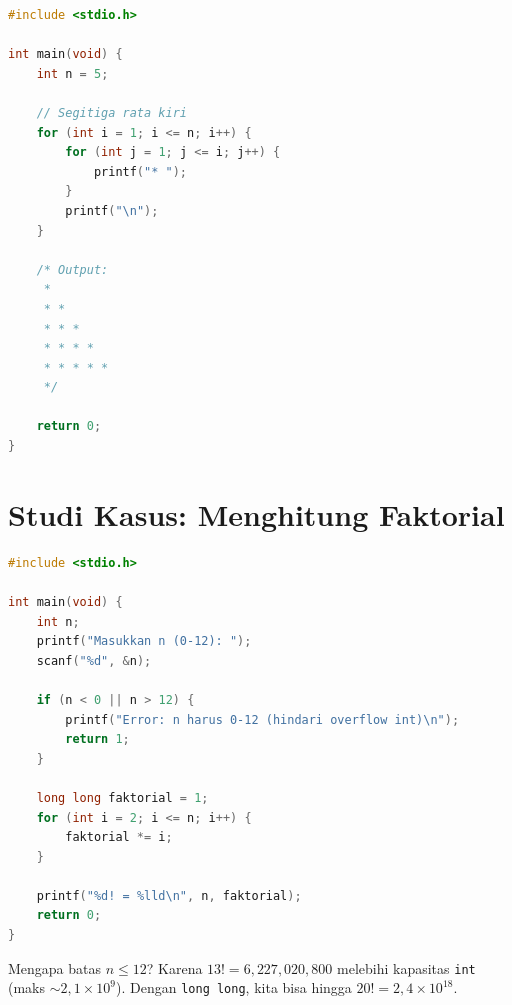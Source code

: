 \documentclass[../main.tex]{subfiles}
\begin{document}
\begin{lstlisting}[language=C,caption=Pola segitiga bintang]
#include <stdio.h>

int main(void) {
    int n = 5;
    
    // Segitiga rata kiri
    for (int i = 1; i <= n; i++) {
        for (int j = 1; j <= i; j++) {
            printf("* ");
        }
        printf("\n");
    }
    
    /* Output:
     * 
     * * 
     * * * 
     * * * * 
     * * * * * 
     */
    
    return 0;
}
\end{lstlisting}





\section{Studi Kasus: Menghitung Faktorial}

\begin{lstlisting}[language=C,caption=Faktorial dengan validasi]
#include <stdio.h>

int main(void) {
    int n;
    printf("Masukkan n (0-12): ");
    scanf("%d", &n);
    
    if (n < 0 || n > 12) {
        printf("Error: n harus 0-12 (hindari overflow int)\n");
        return 1;
    }
    
    long long faktorial = 1;
    for (int i = 2; i <= n; i++) {
        faktorial *= i;
    }
    
    printf("%d! = %lld\n", n, faktorial);
    return 0;
}
\end{lstlisting}

\begin{catatan}
Mengapa batas $n \leq 12$? Karena $13! = 6{,}227{,}020{,}800$ melebihi kapasitas \texttt{int} (maks $\sim 2{,}1 \times 10^9$). Dengan \texttt{long long}, kita bisa hingga $20! = 2{,}4 \times 10^{18}$.
\end{catatan}
\end{document}
